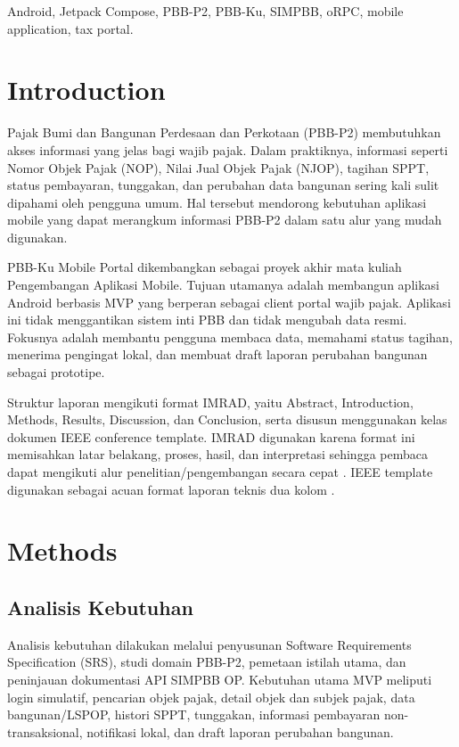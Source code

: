 \documentclass[conference]{report-assets/ref/IEEE-conference-template-062824/IEEEtran}
\begin{document}
\begin{IEEEkeywords}
Android, Jetpack Compose, PBB-P2, PBB-Ku, SIMPBB, oRPC, mobile application, tax portal.
\end{IEEEkeywords}

\section{Introduction}
Pajak Bumi dan Bangunan Perdesaan dan Perkotaan (PBB-P2) membutuhkan akses informasi yang jelas bagi wajib pajak. Dalam praktiknya, informasi seperti Nomor Objek Pajak (NOP), Nilai Jual Objek Pajak (NJOP), tagihan SPPT, status pembayaran, tunggakan, dan perubahan data bangunan sering kali sulit dipahami oleh pengguna umum. Hal tersebut mendorong kebutuhan aplikasi mobile yang dapat merangkum informasi PBB-P2 dalam satu alur yang mudah digunakan.

PBB-Ku Mobile Portal dikembangkan sebagai proyek akhir mata kuliah Pengembangan Aplikasi Mobile. Tujuan utamanya adalah membangun aplikasi Android berbasis MVP yang berperan sebagai client portal wajib pajak. Aplikasi ini tidak menggantikan sistem inti PBB dan tidak mengubah data resmi. Fokusnya adalah membantu pengguna membaca data, memahami status tagihan, menerima pengingat lokal, dan membuat draft laporan perubahan bangunan sebagai prototipe.

Struktur laporan mengikuti format IMRAD, yaitu Abstract, Introduction, Methods, Results, Discussion, dan Conclusion, serta disusun menggunakan kelas dokumen IEEE conference template. IMRAD digunakan karena format ini memisahkan latar belakang, proses, hasil, dan interpretasi sehingga pembaca dapat mengikuti alur penelitian/pengembangan secara cepat \cite{imrad}. IEEE template digunakan sebagai acuan format laporan teknis dua kolom \cite{ieee_template}.

\section{Methods}
\subsection{Analisis Kebutuhan}
Analisis kebutuhan dilakukan melalui penyusunan Software Requirements Specification (SRS), studi domain PBB-P2, pemetaan istilah utama, dan peninjauan dokumentasi API SIMPBB OP. Kebutuhan utama MVP meliputi login simulatif, pencarian objek pajak, detail objek dan subjek pajak, data bangunan/LSPOP, histori SPPT, tunggakan, informasi pembayaran non-transaksional, notifikasi lokal, dan draft laporan perubahan bangunan.
\end{document}
